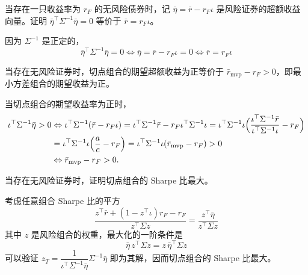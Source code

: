 \begin{problem}
 当存在一只收益率为 $r_{F}$ 的无风险债券时，记 $\bar{\eta}=\bar{r}-r_{F}\iota$ 是风险证券的超额收益向量。证明 $\bar{\eta}^{\top}\Sigma^{-1}\bar{\eta}=0$ 等价于 $\bar{r}=r_{F}\iota$。
\end{problem}
\begin{solution}
因为 $\Sigma^{-1}$ 是正定的，
\[
    \bar{\eta}^{\top}\Sigma^{-1}\bar{\eta}=0\Leftrightarrow\bar{\eta}=\bar{r}-r_{F}\iota=0\Leftrightarrow\bar{r}=r_{F}\iota
\]
\end{solution}

\begin{problem}
 当存在无风险证券时，切点组合的期望超额收益为正等价于 $\bar{r}_{\mathrm{mvp}}-r_{F}>0$，即最小方差组合的期望收益为正。
\end{problem}
\begin{solution}
当切点组合的期望收益率为正时，
\[
    \begin{aligned}
        \iota^{\top}\Sigma^{-1}\bar{\eta}>0
        &\Leftrightarrow\iota^{\top}\Sigma^{-1}(\bar{r}-r_{F}\iota)=\iota^{\top}\Sigma^{-1}\bar{r}-r_{F}\iota^{\top}\Sigma^{-1}\iota=\iota^{\top}\Sigma^{-1}\iota\Bigl(\frac{\iota^{\top}\Sigma^{-1}\bar{r}}{\iota^{\top}\Sigma^{-1}\iota}-r_{F}\Bigr)\\
        &=\iota^{\top}\Sigma^{-1}\iota\Bigl(\frac{a}{c}-r_{F}\Bigr)=\iota^{\top}\Sigma^{-1}\iota(\bar{r}_{\mathrm{mvp}}-r_{F})>0\\
        &\Leftrightarrow\bar{r}_{\mathrm{mvp}}-r_{F}>0.
    \end{aligned}
\]
\end{solution}

\begin{problem}
 当存在无风险证券时，证明切点组合的 Sharpe 比最大。
\end{problem}
\begin{solution}
考虑任意组合 Sharpe 比的平方
\[
    \frac{z^{\top}\bar{r}+(1-z^{\top}\iota)r_{F}-r_{F}}{z^{\top}\Sigma z}=\frac{z^{\top}\bar{\eta}}{z^{\top}\Sigma z}
\]
其中 $z$ 是风险组合的权重，最大化的一阶条件是
\[
    \bar{\eta}\,z^{\top}\Sigma z=z\,\bar{\eta}^{\top}\Sigma z
\]
可以验证 $z_{T}=\dfrac{1}{\iota^{\top}\Sigma^{-1}\bar{\eta}}\Sigma^{-1}\bar{\eta}$ 即为其解，因而切点组合的 Sharpe 比最大。
\end{solution}

